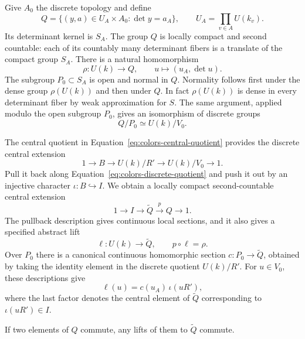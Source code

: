 Give $A_0$ the discrete topology and define
\begin{equation}\label{eq:colors-Q}
 Q=\{(y,a)\in U_A\times A_0:\det y=a_A\},
 \qquad U_A=\prod_{v\in A}U(k_v).
\end{equation}
Its determinant kernel is $S_A$.  The group $Q$ is locally compact and
second countable: each of its countably many determinant fibers is a
translate of the compact group $S_A$.  There is a natural homomorphism
\[
 \rho:U(k)\longrightarrow Q,\qquad u\longmapsto(u_A,\det u).
\]
The subgroup $P_0\subset S_A$ is open and normal in $Q$.  Normality
follows first under the dense group $\rho(U(k))$ and then under $Q$.
In fact $\rho(U(k))$ is dense in every determinant fiber by weak
approximation for $S$.  The same argument, applied modulo the open
subgroup $P_0$, gives an isomorphism of discrete groups
\begin{equation}\label{eq:colors-discrete-quotient}
 Q/P_0\simeq U(k)/V_0.
\end{equation}

The central quotient in Equation~\eqref{eq:colors-central-quotient}
provides the discrete central extension
\[
 1\longrightarrow B\longrightarrow U(k)/R'
 \longrightarrow U(k)/V_0\longrightarrow1.
\]
Pull it back along Equation~\eqref{eq:colors-discrete-quotient} and push
it out by an injective character $\iota:B\hookrightarrow I$.  We obtain
a locally compact second-countable central extension
\begin{equation}\label{eq:colors-circle-extension}
 1\longrightarrow I\longrightarrow\widetilde Q
 \xrightarrow{p}Q\longrightarrow1.
\end{equation}
The pullback description gives continuous local sections, and it also
gives a specified abstract lift
\[
 \ell:U(k)\longrightarrow\widetilde Q,
 \qquad p\circ\ell=\rho.
\]
Over $P_0$ there is a canonical continuous homomorphic section
$c:P_0\to\widetilde Q$, obtained by taking the identity element in the
discrete quotient $U(k)/R'$.  For $u\in V_0$, these descriptions give
\begin{equation}\label{eq:colors-canonical-lift}
 \ell(u)=c(u_A)\,\iota(uR'),
\end{equation}
where the last factor denotes the central element of $\widetilde Q$
corresponding to $\iota(uR')\in I$.

\begin{lemma}\label{lem:colors-commuting-lifts}
If two elements of $Q$ commute, any lifts of them to $\widetilde Q$
commute.
\end{lemma}

